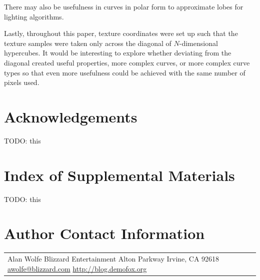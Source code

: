 \documentclass{jcgt}
\begin{document}
There may also be usefulness in curves in polar form to approximate lobes for lighting algorithms.

Lastly, throughout this paper, texture coordinates were set up such that the texture samples were taken only across the diagonal of $N$-dimensional hypercubes.  It would be interesting to explore whether deviating from the diagonal created useful properties, more complex curves, or more complex curve types so that even more usefulness could be achieved with the same number of pixels used.

\section*{Acknowledgements}
\label{sec:acknowledgements}
TODO: this


\small



\section*{Index of Supplemental Materials}
\label{sec:indexofsupplementalmaterials}
TODO: this


\section*{Author Contact Information}

\hspace{-2mm}\begin{tabular}{p{}p{}}
Alan Wolfe \newline
Blizzard Entertainment \newline
16215 Alton Parkway \newline
Irvine, CA 92618 \newline
\href{mailto:awolfe@blizzard.com}{awolfe@blizzard.com}
\href{http://blog.demofox.org}{http://blog.demofox.org}
\end{tabular}


\afterdoc
\end{document}
